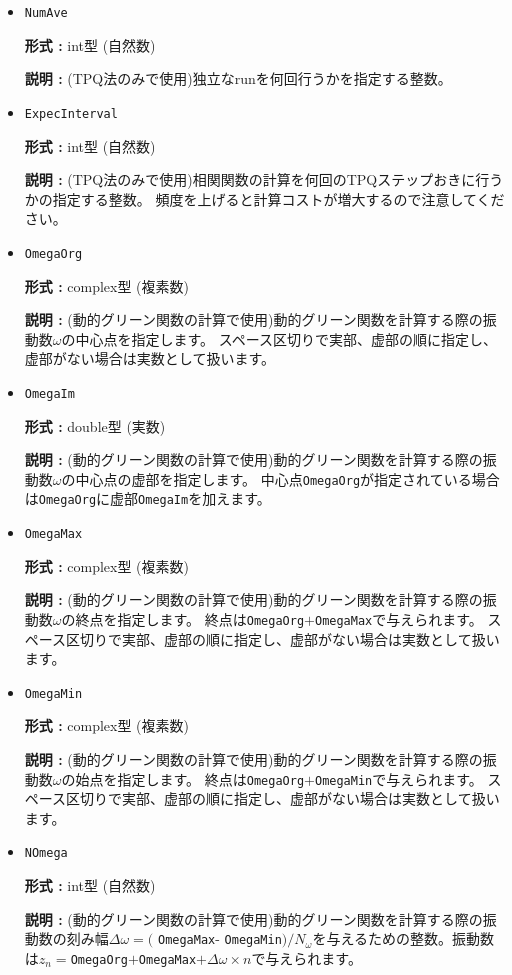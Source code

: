 \begin{itemize}
{\bf 形式 :} double型 (実数)

{\bf 説明 :} (TPQ法のみで使用) TPQで使用する$l-\hat{H}/N_{s}$の$l$を指定する整数。
 
\item \verb|NumAve|

{\bf 形式 :} int型 (自然数)

{\bf 説明 :} (TPQ法のみで使用)独立なrunを何回行うかを指定する整数。

\item \verb|ExpecInterval|

{\bf 形式 :} int型 (自然数)

{\bf 説明 :} (TPQ法のみで使用)相関関数の計算を何回のTPQステップおきに行うかの指定する整数。
頻度を上げると計算コストが増大するので注意してください。

\item \verb|OmegaOrg|

{\bf 形式 :} complex型 (複素数)

{\bf 説明 :} {(動的グリーン関数の計算で使用)動的グリーン関数を計算する際の振動数$\omega$の中心点を指定します。
スペース区切りで実部、虚部の順に指定し、虚部がない場合は実数として扱います。}

\item \verb|OmegaIm|

{\bf 形式 :} double型 (実数)

{\bf 説明 :} {(動的グリーン関数の計算で使用)動的グリーン関数を計算する際の振動数$\omega$の中心点の虚部を指定します。
中心点\verb|OmegaOrg|が指定されている場合は\verb|OmegaOrg|に虚部\verb|OmegaIm|を加えます。}

\item \verb|OmegaMax|

{\bf 形式 :} complex型 (複素数)

{\bf 説明 :} {(動的グリーン関数の計算で使用)動的グリーン関数を計算する際の振動数$\omega$の終点を指定します。
終点は\verb|OmegaOrg|$+$\verb|OmegaMax|で与えられます。
スペース区切りで実部、虚部の順に指定し、虚部がない場合は実数として扱います。}

\item \verb|OmegaMin|

{\bf 形式 :} complex型 (複素数)

{\bf 説明 :} {(動的グリーン関数の計算で使用)動的グリーン関数を計算する際の振動数$\omega$の始点を指定します。
終点は\verb|OmegaOrg|$+$\verb|OmegaMin|で与えられます。
スペース区切りで実部、虚部の順に指定し、虚部がない場合は実数として扱います。}
 
\item \verb|NOmega|

{\bf 形式 :} int型 (自然数)

{\bf 説明 :} {(動的グリーン関数の計算で使用)動的グリーン関数を計算する際の振動数の刻み幅$\Delta \omega = ($ \verb|OmegaMax|- \verb|OmegaMin|$)/N_{\omega}$を与えるための整数。振動数は$z_n=$\verb|OmegaOrg|$+$\verb|OmegaMax|$+ \Delta \omega \times n$で与えられます。} 
 \end{itemize}



